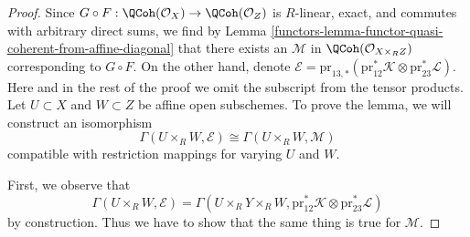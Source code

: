 \begin{proof}

Since $G \circ F : \QCoh(\mathcal{O}_X) \to \QCoh(\mathcal{O}_Z)$
is $R$-linear, exact, and commutes with arbitrary direct sums,
we find by Lemma \ref{functors-lemma-functor-quasi-coherent-from-affine-diagonal}
that there exists an $\mathcal{M}$ in
$\QCoh(\mathcal{O}_{X \times_R Z})$ corresponding to $G \circ F$.
On the other hand, denote
$\mathcal{E} = \text{pr}_{13, *}(\text{pr}_{12}^*\mathcal{K}
\otimes \text{pr}_{23}^*\mathcal{L})$. Here and in the rest of
the proof we omit the subscript from the tensor products.
Let $U \subset X$ and $W \subset Z$ be affine open subschemes.
To prove the lemma, we will construct an isomorphism
$$
\Gamma(U \times_R W, \mathcal{E})
\cong
\Gamma(U \times_R W, \mathcal{M})
$$
compatible with restriction mappings for varying $U$ and $W$.

\medskip\noindent
First, we observe that
$$
\Gamma(U \times_R W, \mathcal{E}) =
\Gamma(U \times_R Y \times_R W,
\text{pr}_{12}^*\mathcal{K} \otimes \text{pr}_{23}^*\mathcal{L})
$$
by construction. Thus we have to show that the same thing is true
for $\mathcal{M}$.


\end{proof}
